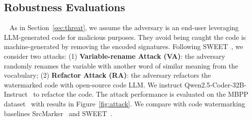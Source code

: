 



\subsection{Robustness Evaluations}~\label{subsec:robustness}
As in Section~\ref{sec:threat}, we assume the adversary is an end-user leveraging LLM-generated code for malicious purposes. They avoid being caught the code is machine-generated by removing the encoded signatures. Following SWEET~\cite{lee2023wrote}, we consider two attacks: (1) \textbf{Variable-rename Attack (VA)}: the adversary randomly renames the variable with another word of similar meaning from the vocabulary; (2) \textbf{Refactor Attack (RA)}: the adversary refactors the watermarked code with open-source code LLM. We instruct 
Qwen2.5-Coder-32B-Instruct~\cite{hui2024qwen2} to refactor the code.
The attack performance is evaluated on the MBPP dataset~\cite{austin2021program} with results in Figure~\ref{fig:attack}. We compare \sys{} with code watermarking baselines SrcMarker~\cite{yang2023towards} and SWEET~\cite{lee2023wrote}. 


